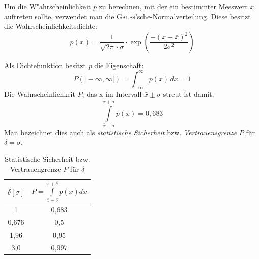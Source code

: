 Um die W"ahrscheinlichkeit $p$ zu berechnen, mit der ein bestimmter
Messwert $x$ auftreten sollte, verwendet man die
\textsc{Gauss}'sche-Normalverteilung. Diese besitzt die Wahrscheinlichkeitsdichte:
\begin{equation}
   p(x) = \frac{1}{\sqrt{2\pi} \cdot \sigma} \cdot 
   \exp\left ( \frac{- (x-\bar x)^2}{2\sigma^2} \right )
\end{equation}

Als Dichtefunktion besitzt $ p $ die Eigenschaft:
\[
P(]-\infty, \infty[)=\int_{-\infty}^{\infty} p(x)\, dx=1
\]
Die Wahrscheinlichkeit $P$, das x im Intervall $\bar x \pm \sigma$ streut ist damit. 
\[
\int\limits_{\bar x-\sigma}^{\bar x+\sigma} p(x)=0,683
\]
Man bezeichnet dies auch als \emph{statistische Sicherheit} bzw. \emph{Vertrauensgrenze} $P$ für $\delta=\sigma$.

\begin{table}[h]
\centering
\caption{Statistische Sicherheit bzw. Vertrauengrenze $P$ für $\delta$}
\begin{tabular}{c|c}
$\delta[\sigma]$ & $P=\int\limits_{\bar x-\delta}^{\bar x+\delta} p(x) dx$ \\ \hline
1 & 0,683 \\
0,676 & 0,5 \\
1,96 & 0,95 \\
3,0 & 0,997
\end{tabular}
\end{table}


